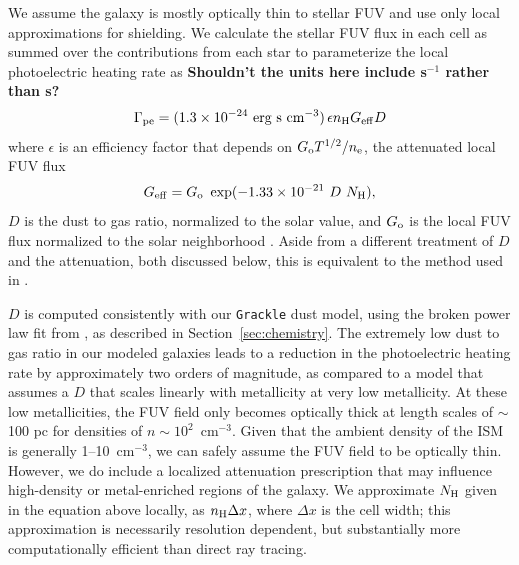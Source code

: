 \documentclass[twocolumn]{aastex61}
\newcommand{\ccunit}{cm$^{-3}$}
\begin{document}

We assume the galaxy is mostly optically thin to stellar FUV and use only local approximations for shielding.  We calculate the stellar FUV flux in each cell as summed over the contributions from each star to parameterize the local photoelectric heating rate as \citep{BakesTielens1994,Wolfire2003,Bergin2004}
    {\bf Shouldn't the units here include s$^{-1}$ rather than s?}
\begin{equation}
\label{eq:PE}
\Gamma_{\rm pe} = (1.3 \times 10^{-24} \mbox{~erg~s~cm}^{-3})\, \epsilon n_{\rm H} G_{\rm eff} D 
\end{equation}
where $\epsilon$ is an efficiency factor that depends on $G_{\rm{o}} T^{1/2} /n_{\rm{e}}$, the attenuated local FUV flux \begin{equation} G_{\rm eff} = G_{\rm o}~\exp(-1.33\times10^{-21}~D~N_{\rm H}), \end{equation} $D$ is the dust to gas ratio, normalized to the solar value, and $G_{\rm o}$ is the local FUV flux normalized to the solar neighborhood \citep{Habing1968}. Aside from a different treatment of $D$ and the attenuation, both discussed below, this is equivalent to the method used in \citet{Hu2016,Hu2017}.

$D$ is computed consistently with our \texttt{Grackle} dust model, using the broken power law fit from \citet{Remy-Ruyer2014}, as described in Section~\ref{sec:chemistry}. The extremely low dust to gas ratio in our modeled galaxies leads to a reduction in the photoelectric heating rate by approximately two orders of magnitude, as compared to a model that assumes a $D$ that scales linearly with metallicity at very low metallicity. At these low metallicities, the FUV field only becomes optically thick at length scales of $\sim$ 100 pc for densities of $n \sim 10^2$~\ccunit. Given that the ambient density of the ISM is generally 1--10~cm$^{-3}$, we can safely assume the FUV field to be optically thin. However, we do include a localized attenuation prescription that may influence high-density or metal-enriched regions of the galaxy. We approximate $N_{\rm H}$ given in the equation above locally, as $n_{\rm H}\Delta x$, where $\Delta x$ is the cell width; this approximation is necessarily resolution dependent, but substantially more computationally efficient than direct ray tracing.
\end{document}
